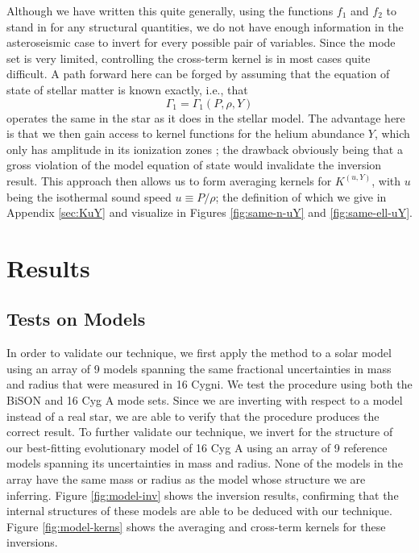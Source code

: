 \documentclass[twocolumn,twocolappendix]{aastex6}
\begin{document}
Although we have written this quite generally, using the functions $f_1$ and $f_2$ to stand in for any structural quantities, we do not have enough information in the asteroseismic case to invert for every possible pair of variables. 
Since the mode set is very limited, controlling the cross-term kernel is in most cases quite difficult. 
A path forward here can be forged by assuming that the equation of state of stellar matter is known exactly, i.e., that
\begin{equation}
    \Gamma_1 = \Gamma_1(P, \rho, Y)
\end{equation}
operates the same in the star as it does in the stellar model.
The advantage here is that we then gain access to kernel functions for the helium abundance $Y$, which only has amplitude in its ionization zones \citep[see][]{Kosovichev1999,ThompsonJCD2002,Basu2009}; the drawback obviously being that a gross violation of the model equation of state would invalidate the inversion result. 
This approach then allows us to form averaging kernels for $K^{(u,Y)}$, with $u$ being the isothermal sound speed $u \equiv P/\rho$; the definition of which we give in Appendix \ref{sec:KuY} and visualize in Figures \ref{fig:same-n-uY} and \ref{fig:same-ell-uY}.


\section{Results}
\subsection{Tests on Models} 

In order to validate our technique, we first apply the method to a solar model using an array of 9 models spanning the same fractional uncertainties in mass and radius that were measured in 16 Cygni. We test the procedure using both the BiSON and 16 Cyg A mode sets. Since we are inverting with respect to a model instead of a real star, we are able to verify that the procedure produces the correct result. To further validate our technique, we invert for the structure of our best-fitting evolutionary model of 16 Cyg A using an array of 9 reference models spanning its uncertainties in mass and radius. None of the models in the array have the same mass or radius as the model whose structure we are inferring. Figure \ref{fig:model-inv} shows the inversion results, confirming that the internal structures of these models are able to be deduced with our technique. Figure \ref{fig:model-kerns} shows the averaging and cross-term kernels for these inversions.
\end{document}
